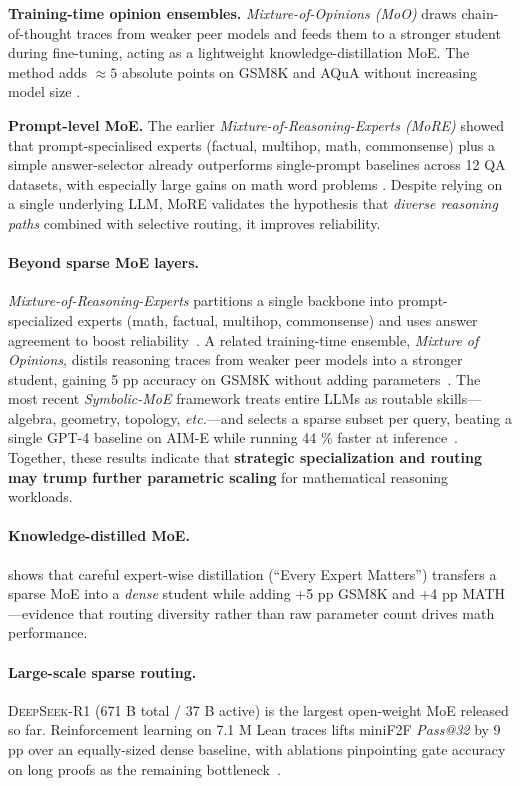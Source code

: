 \documentclass[acmsmall,anonymous]{acmart}
\begin{document}
\textbf{Training-time opinion ensembles.}  
\emph{Mixture-of-Opinions (MoO)} draws chain-of-thought traces from
weaker peer models and feeds them to a stronger student during fine-tuning,
acting as a lightweight knowledge-distillation MoE.  The method adds
$\approx5$ absolute points on GSM8K and AQuA without increasing model
size \citep{chen2025mixtureopinions}.

\textbf{Prompt-level MoE.}  
The earlier \emph{Mixture-of-Reasoning-Experts (MoRE)} showed that
prompt-specialised experts (factual, multihop, math, commonsense) plus a
simple answer-selector already outperforms single-prompt baselines across
12 QA datasets, with especially large gains on math word problems
\citep{si2023more}.  Despite relying on a single underlying LLM, MoRE
validates the hypothesis that \emph{diverse reasoning paths} combined
with selective routing, it improves reliability.

\paragraph{Beyond sparse MoE layers.}
\emph{Mixture-of-Reasoning-Experts} partitions a single backbone into
prompt-specialized experts (math, factual, multihop, commonsense) and
uses answer agreement to boost reliability~\cite{si2023more}. A related
training-time ensemble, \emph{Mixture of Opinions}, distils reasoning
traces from weaker peer models into a stronger student, gaining
5 pp accuracy on GSM8K without adding parameters~\cite{chen2025moo}. The
most recent \emph{Symbolic-MoE} framework treats entire LLMs as routable
skills—algebra, geometry, topology, \emph{etc.}—and selects a sparse
subset per query, beating a single GPT-4 baseline on AIM-E while running
44 \% faster at inference~\cite{chen2025symbolicmoe}. Together, these
results indicate that \textbf{strategic specialization and routing may
trump further parametric scaling} for mathematical reasoning workloads.

\paragraph{Knowledge-distilled MoE.}
\citet{kim2025every} shows that careful expert-wise distillation (“Every
Expert Matters”) transfers a sparse MoE into a \emph{dense} student
while adding +5 pp GSM8K and +4 pp MATH—evidence that routing diversity
rather than raw parameter count drives math performance.

\paragraph{Large-scale sparse routing.}
\textsc{DeepSeek-R1} (671 B total / 37 B active) is the largest
open-weight MoE released so far. Reinforcement learning on 7.1 M Lean
traces lifts miniF2F \textit{Pass@32} by 9 pp over an equally-sized
dense baseline, with ablations pinpointing gate accuracy on long proofs
as the remaining bottleneck~\cite{deepseek2025r1}.
\end{document}
